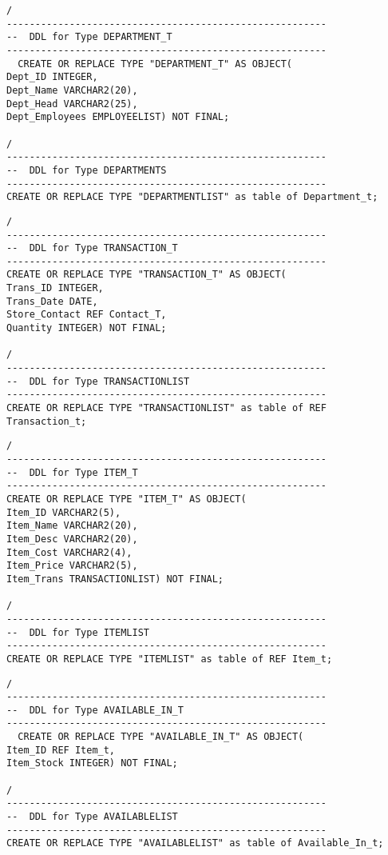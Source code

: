 \documentclass{scrartcl}
\begin{document}
\begin{lstlisting}
/
--------------------------------------------------------
--  DDL for Type DEPARTMENT_T
--------------------------------------------------------
  CREATE OR REPLACE TYPE "DEPARTMENT_T" AS OBJECT(
Dept_ID INTEGER,
Dept_Name VARCHAR2(20),
Dept_Head VARCHAR2(25),
Dept_Employees EMPLOYEELIST) NOT FINAL;

/
--------------------------------------------------------
--  DDL for Type DEPARTMENTS
--------------------------------------------------------
CREATE OR REPLACE TYPE "DEPARTMENTLIST" as table of Department_t;
\end{lstlisting}

\begin{lstlisting}
/
--------------------------------------------------------
--  DDL for Type TRANSACTION_T
--------------------------------------------------------
CREATE OR REPLACE TYPE "TRANSACTION_T" AS OBJECT(
Trans_ID INTEGER,
Trans_Date DATE,
Store_Contact REF Contact_T,
Quantity INTEGER) NOT FINAL;

/
--------------------------------------------------------
--  DDL for Type TRANSACTIONLIST
--------------------------------------------------------
CREATE OR REPLACE TYPE "TRANSACTIONLIST" as table of REF Transaction_t;
\end{lstlisting}

\begin{lstlisting}
/
--------------------------------------------------------
--  DDL for Type ITEM_T
--------------------------------------------------------
CREATE OR REPLACE TYPE "ITEM_T" AS OBJECT(
Item_ID VARCHAR2(5),
Item_Name VARCHAR2(20),
Item_Desc VARCHAR2(20),
Item_Cost VARCHAR2(4),
Item_Price VARCHAR2(5),
Item_Trans TRANSACTIONLIST) NOT FINAL; 

/
--------------------------------------------------------
--  DDL for Type ITEMLIST
--------------------------------------------------------
CREATE OR REPLACE TYPE "ITEMLIST" as table of REF Item_t;
\end{lstlisting}

\begin{lstlisting}
/
--------------------------------------------------------
--  DDL for Type AVAILABLE_IN_T
--------------------------------------------------------
  CREATE OR REPLACE TYPE "AVAILABLE_IN_T" AS OBJECT(
Item_ID REF Item_t,
Item_Stock INTEGER) NOT FINAL;

/
--------------------------------------------------------
--  DDL for Type AVAILABLELIST
--------------------------------------------------------
CREATE OR REPLACE TYPE "AVAILABLELIST" as table of Available_In_t;
\end{lstlisting}
\end{document}
